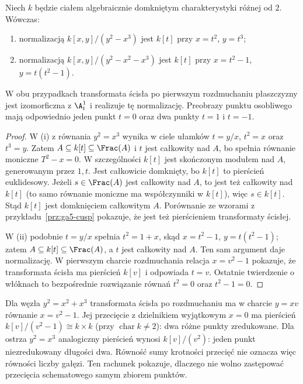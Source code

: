 \begin{stwierdzenie}
\label{st:ga5-normalization}
Niech $k$ będzie ciałem algebraicznie domkniętym
charakterystyki różnej od $2$. Wówczas:
\begin{enumerate}[label=(\roman*)]
\item normalizacją $k[x,y]/(y^2-x^3)$ jest $k[t]$
przy $x=t^2$, $y=t^3$;
\item normalizacją $k[x,y]/(y^2-x^2-x^3)$ jest
$k[t]$ przy $x=t^2-1$, $y=t(t^2-1)$.
\end{enumerate}
W obu przypadkach transformata ścisła po pierwszym
rozdmuchaniu płaszczyzny jest izomorficzna z $\A^1_t$
i realizuje tę normalizację. Preobrazy punktu osobliwego
mają odpowiednio jeden punkt $t=0$ oraz dwa punkty
$t=1$ i $t=-1$.
\end{stwierdzenie}
\begin{proof}
W (i) z równania $y^2=x^3$ wynika w ciele ułamków
$t=y/x$, $t^2=x$ oraz $t^3=y$. Zatem
$A\subseteq k[t]\subseteq\Frac(A)$ i $t$ jest całkowity
nad $A$, bo spełnia równanie moniczne $T^2-x=0$.
W szczególności $k[t]$ jest skończonym modułem nad
$A$, generowanym przez $1,t$. Jest całkowicie
domknięty, bo $k[t]$ to pierścień euklidesowy.
Jeżeli $s\in\Frac(A)$ jest całkowity nad $A$, to jest
też całkowity nad $k[t]$ (to samo równanie moniczne
ma współczynniki w $k[t]$), więc $s\in k[t]$.
Stąd $k[t]$ jest domknięciem całkowitym $A$.
Porównanie ze wzorami z przykładu~\ref{prz:ga5-cusp}
pokazuje, że jest też pierścieniem transformaty ścisłej.

W (ii) podobnie $t=y/x$ spełnia $t^2=1+x$,
skąd $x=t^2-1$, $y=t(t^2-1)$; zatem
$A\subseteq k[t]\subseteq\Frac(A)$, a $t$ jest
całkowity nad $A$. Ten sam argument daje normalizację.
W pierwszym charcie rozdmuchania relacja
$x=v^2-1$ pokazuje, że transformata ścisła ma
pierścień $k[v]$ i odpowiada $t=v$.
Ostatnie twierdzenie o włóknach to bezpośrednie
rozwiązanie równań $t^2=0$ oraz $t^2-1=0$.
\end{proof}

\begin{przyklad}
Dla węzła $y^2=x^2+x^3$ transformata ścisła po
rozdmuchaniu ma w charcie $y=xv$ równanie
$x=v^2-1$. Jej przecięcie z dzielnikiem wyjątkowym
$x=0$ ma pierścień $k[v]/(v^2-1)\cong k\times k$
(przy $\operatorname{char}k\ne2$): dwa różne punkty
zredukowane. Dla ostrza $y^2=x^3$ analogiczny
pierścień wynosi $k[v]/(v^2)$: jeden punkt
niezredukowany długości dwa. Równość sumy krotności
przecięć nie oznacza więc równości liczby gałęzi.
Ten rachunek pokazuje, dlaczego nie wolno zastępować
przecięcia schematowego samym zbiorem punktów.
\end{przyklad}

